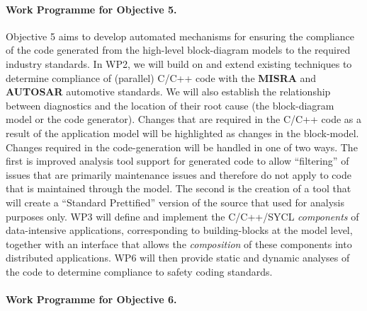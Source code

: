 \documentclass[a4paper,11pt]{article}
\begin{document}
\paragraph*{Work Programme for Objective 5.}
Objective 5 aims to develop automated mechanisms for ensuring the compliance of the code generated from the 
high-level block-diagram models to the required industry standards. %
In WP2, we will build on and extend existing techniques to determine compliance of (parallel)
C/C++ code with the \textbf{MISRA} and \textbf{AUTOSAR} automotive standards. %
We will also establish the relationship between diagnostics and the
location of their root cause (the block-diagram model or the code
generator).  Changes that are required in the C/C++ code as a result of the
application model will be highlighted as changes in the block-model.
Changes required in the code-generation will be handled in one of two
ways.  The first is improved analysis tool support for generated code to
allow ``filtering'' of issues that are primarily maintenance issues and
therefore do not apply to code that is maintained through the model.  The
second is the creation of a tool that will create a ``Standard Prettified''
version of the source that used for analysis purposes only.
WP3 will define and implement the C/C++/SYCL \emph{components} of data-intensive
applications, corresponding to building-blocks at the model level,
together with an interface that allows the \emph{composition} of these
components into distributed applications. WP6 will then provide static and
dynamic analyses of the code to determine compliance to safety coding
standards.



\paragraph*{Work Programme for Objective 6.}
\end{document}
